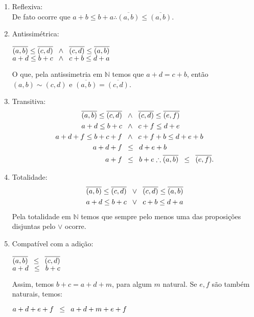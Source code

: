 \documentclass[../main.tex]{subfiles}
\begin{document}
\begin{dem}
    \begin{enumerate}[label=(\roman*)]
        \item Reflexiva: \\
            De fato ocorre que $a+b \leq b+a \therefore \overline{(a,b)} \leq \overline{(a,b)}$.
        
        \item Antissimétrica: 
            \begin{center}
                $\overline{(a,b)} \leq \overline{(c,d)} \hspace{8pt} {\land} \hspace{8pt} \overline{(c,d)} \leq \overline{(a,b)}$ \\
                $a+d \leq b+c \hspace{8pt} {\land} \hspace{8pt} c+b \leq d+a$
            \end{center}
            O que, pela antissimetria em $\mathbb{N}$ temos que $a+d = c+b$, então $(a,b) \sim (c,d)$ e $\overline{(a,b)} = \overline{(c,d)} $.
        
        \item Transitiva: 
        \begin{align*}
            \overline{(a,b)} \leq \overline{(c,d)} & \hspace{8pt} {\land} \hspace{8pt} \overline{(c,d)} \leq \overline{(e,f)}  \\
            a+d \leq b+c & \hspace{8pt} {\land} \hspace{8pt} c+f \leq d+e  \\
            a+d+f \leq b + c + f & \hspace{8pt} {\land} \hspace{8pt} c + f + b \leq d + e + b  \\
            a + d + f & \hspace{8pt} {\leq} \hspace{8pt} d + e + b \\
            a + f & \hspace{8pt} {\leq} \hspace{8pt} b + e 
            \therefore \overline{(a,b)}  \hspace{8pt} {\leq} \hspace{8pt} \overline{(e,f)}.
        \end{align*}
            
        \item Totalidade: 
        \begin{align*}
            \overline{(a,b)} \leq \overline{(c,d)} & \hspace{8pt} {\lor} \hspace{8pt} \overline{(c,d)} \leq \overline{(a,b)} \\ 
            a+d \leq b+c & \hspace{8pt} {\lor} \hspace{8pt} c+b \leq d+a   
        \end{align*}
        Pela totalidade em $\mathbb{N}$ temos que sempre pelo menos uma das proposições disjuntas pelo $\lor$ ocorre.
        
        \item Compatível com a adição: \\
        \begin{center}
            $\overline{(a,b)} \hspace{8pt} {\leq} \hspace{8pt} \overline{(c,d)}$ \\
            $a+d \hspace{8pt} {\leq} \hspace{8pt} b+c$ 
        \end{center}
            Assim, temos $b+c = a+d + m$, para algum $m$ natural. Se $e, f$ são também naturais, temos: \\
        \begin{center}    
           $a+d+e+f \hspace{8pt} {\leq} \hspace{8pt} a+d+m+e+f$ \\


\end{center}
\end{enumerate}
\end{dem}
\end{document}
